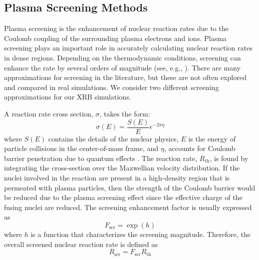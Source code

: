 \documentclass[preprint,times,tighten,linenumbers]{aastex631}
\begin{document}


\subsection{Plasma Screening Methods}\label{Sec:screening}

Plasma screening is the enhancement of nuclear reaction rates due to the Coulomb coupling of the surrounding plasma electrons and ions. Plasma screening plays an important role in accurately calculating nuclear reaction rates in dense regions.
Depending on the thermodynamic conditions, 
screening can enhance the rate by several orders
of magnitude (see, e.g., \citealt{woosley-ignition}).
There are many approximations for screening in the literature, but these are not
often explored and compared in real simulations.
We consider two different screening approximations
for our XRB simulations.

A reaction rate cross section, $\sigma$, takes the form:
\begin{equation}
    \sigma(E) = \frac{S(E)}{E} e^{-2\pi \eta}
\end{equation}
where $S(E)$ contains the details of the nuclear physics, $E$ is the energy of particle collisions in the center-of-mass frame, and $\eta$, accounts for Coulomb barrier penetration due to quantum effects \citep{Newton2007}. The reaction rate, $R_{\textrm{th}}$, is found by integrating the cross-section over the Maxwellian velocity distribution.  If the nuclei involved in the reaction are present in a high-density region that is permeated with plasma particles, then the strength of the Coulomb barrier would be reduced due to the plasma screening effect since the effective charge of the fusing nuclei are reduced. The screening enhancement factor is usually expressed as
\begin{equation}
    F_{\textrm{scr}} = \exp{(h)}
\end{equation}
where $h$ is a function that characterizes the screening magnitude. Therefore, the overall screened nuclear reaction rate is defined as
\begin{equation}\label{Eq:screened_rate}
    R_{\textrm{scr}} = F_{\textrm{scr}}R_{\textrm{th}}
\end{equation}
\end{document}
